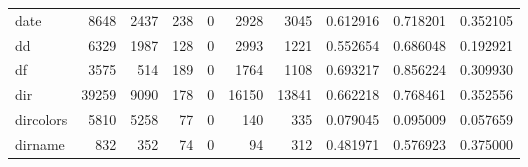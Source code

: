 \begin{tabular}{lrrrrrrrrr}
date      &                                8648 &                                            2437 &                                            238 &                                             0 &                                           2928 &                                         3045 &                                           0.612916 &                               0.718201 &                             0.352105 \\
dd        &                                6329 &                                            1987 &                                            128 &                                             0 &                                           2993 &                                         1221 &                                           0.552654 &                               0.686048 &                             0.192921 \\
df        &                                3575 &                                             514 &                                            189 &                                             0 &                                           1764 &                                         1108 &                                           0.693217 &                               0.856224 &                             0.309930 \\
dir       &                               39259 &                                            9090 &                                            178 &                                             0 &                                          16150 &                                        13841 &                                           0.662218 &                               0.768461 &                             0.352556 \\
dircolors &                                5810 &                                            5258 &                                             77 &                                             0 &                                            140 &                                          335 &                                           0.079045 &                               0.095009 &                             0.057659 \\
dirname   &                                 832 &                                             352 &                                             74 &                                             0 &                                             94 &                                          312 &                                           0.481971 &                               0.576923 &                             0.375000 \\

\end{tabular}
